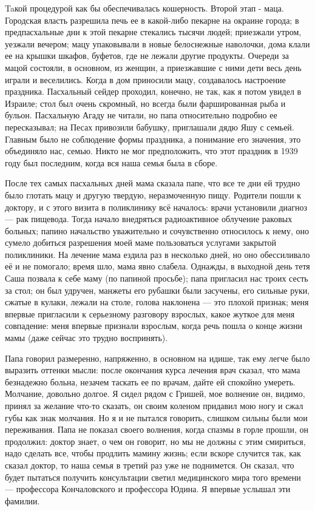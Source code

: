 \label{179-1}
Taкой процедурой как бы обеспечивалась кошерность. Второй этап - маца. Городская власть разрешила печь ее в какой-либо пекарне на окраине города; в предпасхальные дни к этой пекарне стекались тысячи людей; приезжали утром, уезжали вечером; мацу упаковывали в новые белоснежные наволочки, дома клали ее на крышки шкафов, буфетов, где не лежали другие продукты. Очереди за мацой состояли, в основном, из женщин, а приезжавшие с ними дети весь день играли и веселились. Когда в дом приносили мацу, создавалось настроение праздника. Пасхальный сейдер проходил, конечно, не так, как я потом увидел в Израиле; стол был очень скромный, но всегда были фаршированная рыба и бульон. Пасхальную Агаду не читали, но папа относительно подробно ее пересказывал; на Песах привозили бабушку, приглашали дядю Яшу с семьей. Главным было не соблюдение формы праздника, а понимание его значения, это объединяло нас, семью. Никто не мог предположить, что этот праздник в 1939 году был последним, когда вся наша семья была в сборе.

\label{180-1}
После тех самых пасхальных дней мама сказала папе, что все те дни ей трудно было глотать мацу и другую твердую, 
неразмоченную пищу. Родители пошли к доктору, и с этого визита в поликлинику всё началось: врачи установили диагноз — рак пищевода. Тогда начало внедряться радиоактивное облучение раковых больных; папино начальство уважительно и сочувственно относилось к нему, оно сумело добиться разрешения моей маме пользоваться услугами закрытой поликлиники. На лечение мама ездила раз в несколько дней, но оно обессиливало её и не помогало; время шло, мама явно слабела. Однажды, в выходной день тетя Саша позвала к себе маму (по папиной просьбе); папа пригласил нас троих сесть за стол; он был удручен, манжеты его рубашки были засучены, его сильные руки, сжатые в кулаки, лежали на столе, голова наклонена — это плохой признак; меня впервые пригласили к серьезному разговору взрослых, какое жуткое для меня совпадение: меня впервые признали взрослым, когда речь пошла о конце жизни мамы (даже сейчас это трудно воспринять).

\label{181-1}
Папа говорил размеренно, напряженно, в основном на идише, так ему легче было выразить оттенки мысли: после окончания курса лечения врач сказал, что мама безнадежно больна, незачем таскать ее по врачам, дайте ей спокойно умереть. Молчание, довольно долгое. Я сидел рядом с Гришей, мое волнение он, видимо, принял за желание что-то сказать, он своим коленом придавил мою ногу и сжал губы как знак молчания. Но я и не пытался говорить, слишком сильны были мои переживания. Папа не показал своего волнения, когда спазмы в горле прошли, он продолжил: доктор знает, о чем он говорит, но мы не должны с этим смириться, надо сделать все, чтобы продлить мамину жизнь; если вскоре случится так, как сказал доктор, то наша семья в третий раз уже не поднимется. Он сказал, что будет пытаться получить консультации светил медицинского мира того времени — профессора Кончаловского и профессора Юдина. Я впервые услышал эти фамилии.

